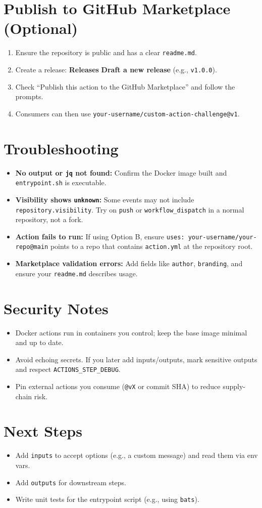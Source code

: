 \documentclass[11pt]{article}
\begin{document}
\section{Publish to GitHub Marketplace (Optional)}
\begin{enumerate}
  \item Ensure the repository is public and has a clear \texttt{readme.md}.
  \item Create a release: \textbf{Releases} \textrightarrow{} \textbf{Draft a new release} (e.g., \texttt{v1.0.0}).
  \item Check ``Publish this action to the GitHub Marketplace'' and follow the prompts.
  \item Consumers can then use \texttt{your-username/custom-action-challenge@v1}.
\end{enumerate}

\section{Troubleshooting}
\begin{itemize}
  \item \textbf{No output or \texttt{jq} not found:} Confirm the Docker image built and \texttt{entrypoint.sh} is executable.
  \item \textbf{Visibility shows \texttt{unknown}:} Some events may not include \texttt{repository.visibility}. Try on \texttt{push} or \texttt{workflow\_dispatch} in a normal repository, not a fork.
  \item \textbf{Action fails to run:} If using Option B, ensure \texttt{uses: your-username/your-repo@main} points to a repo that contains \texttt{action.yml} at the repository root.
  \item \textbf{Marketplace validation errors:} Add fields like \texttt{author}, \texttt{branding}, and ensure your \texttt{readme.md} describes usage.
\end{itemize}
\clearpage

\section*{Security Notes}
\begin{itemize}
  \item Docker actions run in containers you control; keep the base image minimal and up to date.
  \item Avoid echoing secrets. If you later add inputs/outputs, mark sensitive outputs and respect \texttt{ACTIONS\_STEP\_DEBUG}.
  \item Pin external actions you consume (\texttt{@vX} or commit SHA) to reduce supply-chain risk.
\end{itemize}

\section*{Next Steps}
\begin{itemize}
  \item Add \texttt{inputs} to accept options (e.g., a custom message) and read them via env vars.
  \item Add \texttt{outputs} for downstream steps.
  \item Write unit tests for the entrypoint script (e.g., using \texttt{bats}).
\end{itemize}
\end{document}

